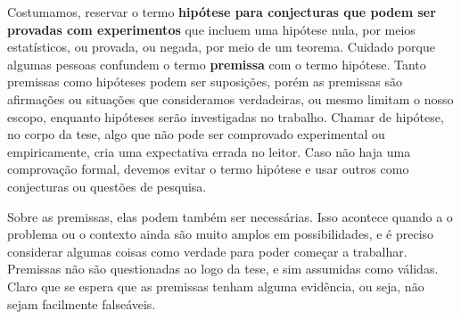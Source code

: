 Costumamos, reservar o termo \textbf{hipótese para conjecturas que podem ser provadas com experimentos} que incluem uma hipótese nula, por meios estatísticos, ou provada, ou negada, por meio de um teorema.
Cuidado porque algumas pessoas confundem o termo \textbf{premissa} com o termo hipótese. Tanto premissas como hipóteses podem ser suposições, porém as premissas são afirmações ou situações que consideramos verdadeiras, ou mesmo limitam o nosso escopo, enquanto hipóteses serão investigadas no trabalho.
Chamar de hipótese, no corpo da tese, algo que não pode ser comprovado experimental ou empiricamente, cria uma expectativa errada no leitor. 
Caso não haja uma comprovação formal, devemos evitar o termo hipótese e usar outros como conjecturas ou questões de pesquisa.

Sobre as premissas, elas podem também ser necessárias. Isso acontece quando a o problema ou o contexto ainda são muito amplos em possibilidades, e é preciso considerar algumas coisas como verdade para poder começar a trabalhar. Premissas não são questionadas ao logo da tese, e sim assumidas como válidas. Claro que se espera que as premissas tenham alguma evidência, ou seja, não sejam facilmente falseáveis.



